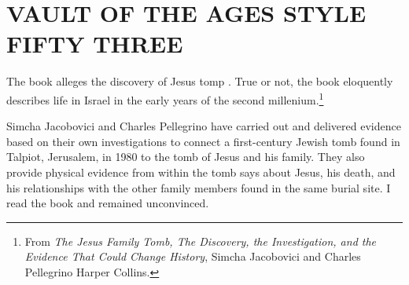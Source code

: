 


\chapter{VAULT OF THE AGES STYLE FIFTY THREE}


The book alleges the discovery of Jesus tomp \cite{style53}. True or not, the book eloquently describes  life in Israel in the early years of the second millenium.\footnote{From \textit{The
Jesus
Family
Tomb,   
The Discovery, the Investigation,
and the Evidence
That Could Change History}, 
Simcha Jacobovici and Charles Pellegrino
Harper Collins.}

Simcha Jacobovici and Charles
Pellegrino have carried out and delivered evidence based on their own investigations to 
connect a first-century Jewish tomb found in Talpiot, Jerusalem,
in 1980 to the tomb of Jesus and his family. They also provide physical evidence from within the tomb says about Jesus, his death, and his relationships with the other family members found in
the same burial site. I read the book and remained unconvinced. 

